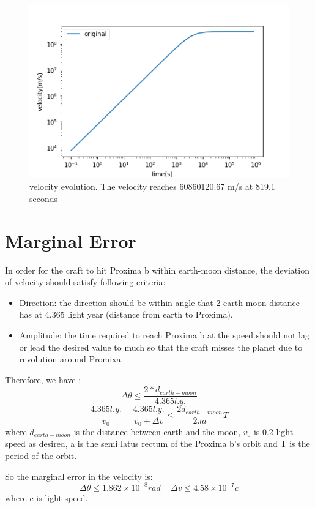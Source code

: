 \documentclass{article}
\begin{document}
\begin{figure}[]
	\centering
	\includegraphics[width=12cm]{simu.png}
	
	\caption{velocity evolution. The velocity reaches 60860120.67 m/s at 819.1 seconds}
	\label{sim1}
\end{figure}


\section{Marginal Error}
	In order for the craft to hit Proxima b within earth-moon distance, the deviation of velocity should satisfy following criteria:
	\begin{itemize}
		\item Direction: the direction should be within angle that 2 earth-moon distance has at 4.365 light year (distance from earth to Proxima). 
		\item Amplitude: the time required to reach Proxima b at the speed should not lag or lead the desired value to much so that the craft misses the planet due to revolution around Promixa. 
	\end{itemize}
	Therefore, we have :
	\begin{equation}
		\Delta \theta \le \frac{2*d_{earth-moon}}{4.365 l.y.}
	\end{equation}
	\begin{equation}
		\frac{4.365l.y.}{v_0}- \frac{4.365l.y.}{v_0+\Delta v}\le \frac{2d_{earth-moon}}{2\pi a} T
	\end{equation}
	where $d_{earth-moon}$ is the distance between earth and the moon, $v_0$ is 0.2 light speed as desired, a is the semi latus rectum of the Proxima b's orbit and T is the period of the orbit.
	
	So the marginal error in the velocity is:
	\begin{equation}
		\Delta \theta \le 1.862 \times 10^{-8} rad
		\,\,\,\,\,\,\,
		\Delta v \le 4.58 \times 10^{-7} c
	\end{equation}
	where c is light speed.
	
\end{document}
